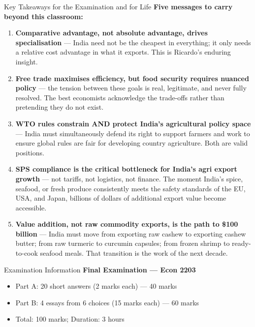 \documentclass[
  ignorenonframetext,
  aspectratio=169,
]{beamer}
\makeatletter
\providecommand{\tightlist}{%
  \setlength{\itemsep}{0pt}\setlength{\parskip}{0pt}}
\let\quarto@originallabel\label
\DeclareRobustCommand*{\label}[1]{\quarto@originallabel{#1}}
\makeatother
\begin{document}
\begin{frame}
\begin{block}{Key Takeaways for the Examination and for Life}
\label{key-takeaways-for-the-examination-and-for-life}
\textbf{Five messages to carry beyond this classroom:}

\begin{enumerate}
\item
  \textbf{{Comparative advantage, not absolute advantage, drives
  specialisation}} --- India need not be the cheapest in everything; it
  only needs a relative cost advantage in what it exports. This is
  Ricardo's enduring insight.
\item
  \textbf{{Free trade maximises efficiency, but food security requires
  nuanced policy}} --- the tension between these goals is real,
  legitimate, and never fully resolved. The best economists acknowledge
  the trade-offs rather than pretending they do not exist.
\item
  \textbf{{WTO rules constrain AND protect India's agricultural policy
  space}} --- India must simultaneously defend its right to support
  farmers and work to ensure global rules are fair for developing
  country agriculture. Both are valid positions.
\item
  \textbf{{SPS compliance is the critical bottleneck for India's agri
  export growth}} --- not tariffs, not logistics, not finance. The
  moment India's spice, seafood, or fresh produce consistently meets the
  safety standards of the EU, USA, and Japan, billions of dollars of
  additional export value become accessible.
\item
  \textbf{{Value addition, not raw commodity exports, is the path to
  \$100 billion}} --- India must move from exporting raw cashew to
  exporting cashew butter; from raw turmeric to curcumin capsules; from
  frozen shrimp to ready-to-cook seafood meals. That transition is the
  work of the next decade.
\end{enumerate}
\end{block}
\end{frame}

\begin{frame}
\begin{block}{Examination Information}
\label{examination-information}
\textbf{Final Examination --- Econ 2203}

\begin{itemize}
\tightlist
\item
  Part A: 20 short answers (2 marks each) --- 40 marks
\item
  Part B: 4 essays from 6 choices (15 marks each) --- 60 marks
\item
  Total: 100 marks; Duration: 3 hours
\end{itemize}
\end{block}
\end{frame}
\end{document}
